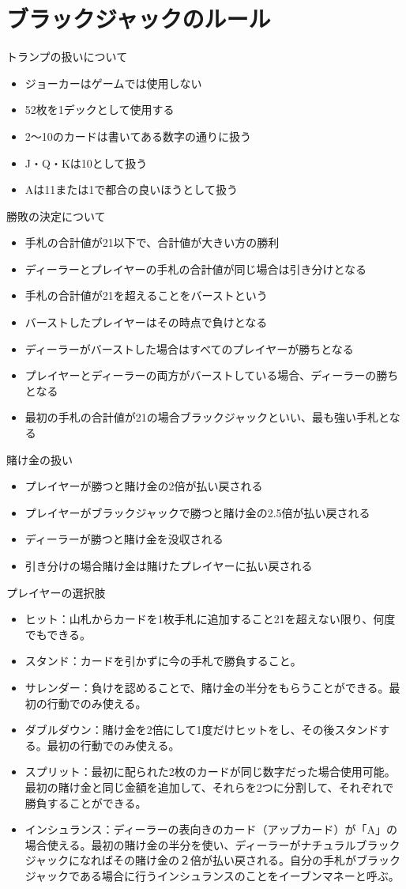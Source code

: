 \section{ブラックジャックのルール}

トランプの扱いについて
\begin{itemize}
\item ジョーカーはゲームでは使用しない
\item 52枚を1デックとして使用する
\item 2～10のカードは書いてある数字の通りに扱う
\item J・Q・Kは10として扱う
\item Aは11または1で都合の良いほうとして扱う
\end{itemize}
勝敗の決定について
\begin{itemize}
\item 手札の合計値が21以下で、合計値が大きい方の勝利
\item ディーラーとプレイヤーの手札の合計値が同じ場合は引き分けとなる
\item 手札の合計値が21を超えることをバーストという
\item バーストしたプレイヤーはその時点で負けとなる
\item ディーラーがバーストした場合はすべてのプレイヤーが勝ちとなる
\item プレイヤーとディーラーの両方がバーストしている場合、ディーラーの勝ちとなる
\item 最初の手札の合計値が21の場合ブラックジャックといい、最も強い手札となる
\end{itemize}
賭け金の扱い
\begin{itemize}
\item プレイヤーが勝つと賭け金の2倍が払い戻される
\item プレイヤーがブラックジャックで勝つと賭け金の2.5倍が払い戻される
\item ディーラーが勝つと賭け金を没収される
\item 引き分けの場合賭け金は賭けたプレイヤーに払い戻される
\end{itemize}
プレイヤーの選択肢
\begin{itemize}
\item ヒット：山札からカードを1枚手札に追加すること21を超えない限り、何度でもできる。
\item スタンド：カードを引かずに今の手札で勝負すること。
\item サレンダー：負けを認めることで、賭け金の半分をもらうことができる。最初の行動でのみ使える。
\item ダブルダウン：賭け金を2倍にして1度だけヒットをし、その後スタンドする。最初の行動でのみ使える。
\item スプリット：最初に配られた2枚のカードが同じ数字だった場合使用可能。最初の賭け金と同じ金額を追加して、それらを2つに分割して、それぞれで勝負することができる。
\item インシュランス：ディーラーの表向きのカード（アップカード）が「A」の場合使える。最初の賭け金の半分を使い、ディーラーがナチュラルブラックジャックになればその賭け金の２倍が払い戻される。自分の手札がブラックジャックである場合に行うインシュランスのことをイーブンマネーと呼ぶ。
\end{itemize}
